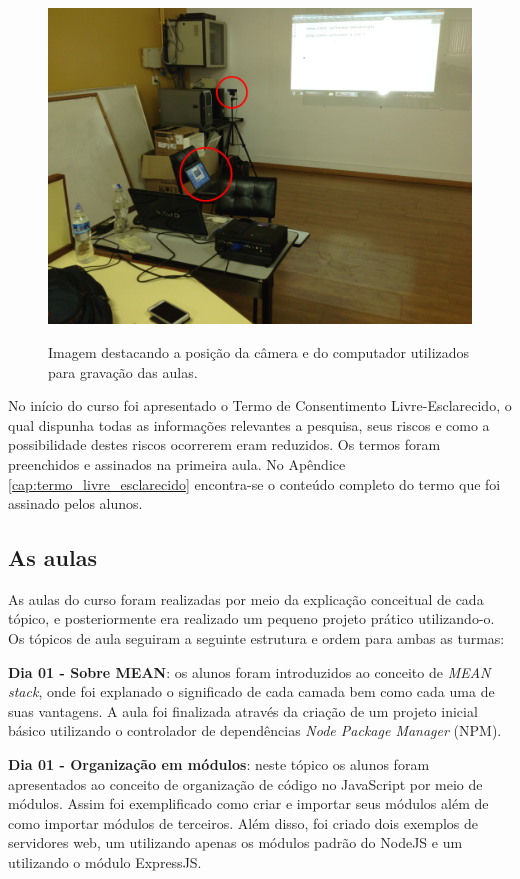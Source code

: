 \begin{figure}[!h]
\centering
\caption{Imagem destacando a posição da câmera e do computador utilizados para gravação das aulas.}
\includegraphics[width=1.0\textwidth]{imgs/lab_2.jpg}
\label{fig:lab_2} 
\end{figure}

No início do curso foi apresentado o Termo de Consentimento Livre-Esclarecido, o qual dispunha todas as informações relevantes a pesquisa, seus riscos e como a possibilidade destes riscos ocorrerem eram reduzidos. Os termos foram preenchidos e assinados na primeira aula. No Apêndice \ref{cap:termo_livre_esclarecido} encontra-se o conteúdo completo do termo que foi assinado pelos alunos.

\subsection{As aulas}

As aulas do curso foram realizadas por meio da explicação conceitual de cada tópico, e posteriormente era realizado um pequeno projeto prático utilizando-o. Os tópicos de aula seguiram a seguinte estrutura e ordem para ambas as turmas:

\textbf{Dia 01 - Sobre MEAN}: os alunos foram introduzidos ao conceito de \emph{MEAN stack}, onde foi explanado o significado de cada camada bem como cada uma de suas vantagens. A aula foi finalizada através da criação de um projeto inicial básico utilizando o controlador de dependências \emph{Node Package Manager} (NPM).

\textbf{Dia 01 - Organização em módulos}: neste tópico os alunos foram apresentados ao conceito de organização de código no JavaScript por meio de módulos. Assim foi exemplificado como criar e importar seus módulos além de como importar módulos de terceiros. Além disso, foi criado dois exemplos de servidores web, um utilizando apenas os módulos padrão do NodeJS e um utilizando o módulo ExpressJS.

